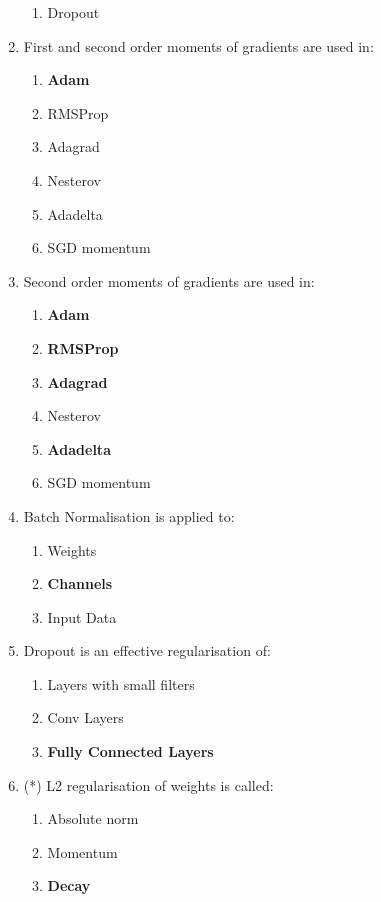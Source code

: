 \documentclass{report}
\numberwithin{equation}{section}
\begin{document}
\begin{enumerate}
\begin{enumerate}[label=\alph*.]
        \item Dropout
    \end{enumerate}
    \item First and second order moments of gradients are used in:
    \begin{enumerate}[label=\alph*.]
        \item \textbf{Adam}
        \item RMSProp
        \item Adagrad
        \item Nesterov
        \item Adadelta
        \item SGD momentum
    \end{enumerate}
    \item Second order moments of gradients are used in:
    \begin{enumerate}[label=\alph*.]
        \item \textbf{Adam}
        \item \textbf{RMSProp}
        \item \textbf{Adagrad}
        \item Nesterov
        \item \textbf{Adadelta}
        \item SGD momentum
    \end{enumerate}
    \item Batch Normalisation is applied to:
    \begin{enumerate}[label=\alph*.]
        \item Weights
        \item \textbf{Channels}
        \item Input Data
    \end{enumerate}
    \item Dropout is an effective regularisation of:
    \begin{enumerate}[label=\alph*.]
        \item Layers with small filters
        \item Conv Layers
        \item \textbf{Fully Connected Layers}
    \end{enumerate}
    \item (*) L2 regularisation of weights is called:
    \begin{enumerate}[label=\alph*.]
        \item Absolute norm
        \item Momentum
        \item \textbf{Decay}

\end{enumerate}
\end{enumerate}
\end{document}

